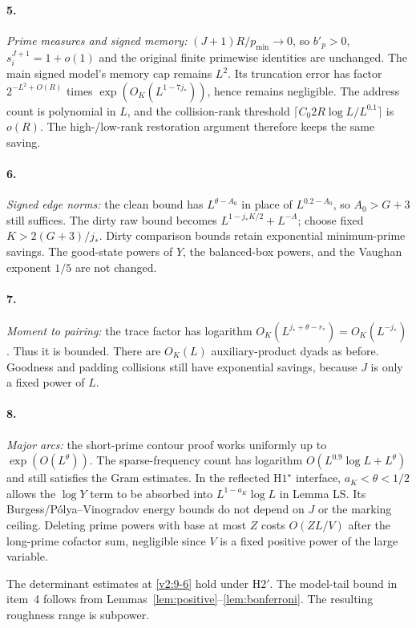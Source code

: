 \documentclass[11pt]{article}
\theoremstyle{definition}
\theoremstyle{remark}
\numberwithin{equation}{section}
\begin{document}
\paragraph{5.} \emph{Prime measures and signed memory:} $(J+1)R/p_{\min}\to0$, so $b'_p>0$, $s_i^{J+1}=1+o(1)$ and the original finite primewise identities are unchanged. The main signed model's memory cap remains $L^2$. Its truncation error has factor $2^{-L^2+O(R)}$ times $\exp(O_K(L^{1-7j_*}))$, hence remains negligible. The address count is polynomial in $L$, and the collision-rank threshold $\lceil C_0 2R\log L/L^{0.1}\rceil$ is $o(R)$. The high-/low-rank restoration argument therefore keeps the same saving.
\paragraph{6.} \emph{Signed edge norms:} the clean bound has $L^{\theta-A_0}$ in place of $L^{0.2-A_0}$, so $A_0>G+3$ still suffices. The dirty raw bound becomes $L^{1-j_* K/2}+L^{-A}$; choose fixed $K>2(G+3)/j_*$. Dirty comparison bounds retain exponential minimum-prime savings. The good-state powers of $Y$, the balanced-box powers, and the Vaughan exponent $1/5$ are not changed.
\paragraph{7.} \emph{Moment to pairing:} the trace factor has logarithm $O_K(L^{j_*+\theta-r_*})=O_K(L^{-j_*})$. Thus it is bounded. There are $O_K(L)$ auxiliary-product dyads as before. Goodness and padding collisions still have exponential savings, because $J$ is only a fixed power of $L$.
\paragraph{8.} \emph{Major arcs:} the short-prime contour proof works uniformly up to $\exp(O(L^\theta))$. The sparse-frequency count has logarithm $O(L^{0.9}\log L+L^\theta)$ and still satisfies the Gram estimates. In the reflected $\mathrm H1^\star$ interface, $a_K<\theta<1/2$ allows the $\log Y$ term to be absorbed into $L^{1-a_K}\log L$ in Lemma LS. Its Burgess/P\'olya–Vinogradov energy bounds do not depend on $J$ or the marking ceiling. Deleting prime powers with base at most $Z$ costs $O(ZL/V)$ after the long-prime cofactor sum, negligible since $V$ is a fixed positive power of the large variable.

The determinant estimates at \eqref{v2:9-6} hold under $\mathrm H2'$. The model-tail bound in item~4 follows from Lemmas~\ref{lem:positive}--\ref{lem:bonferroni}. The resulting roughness range is subpower.
\end{document}
